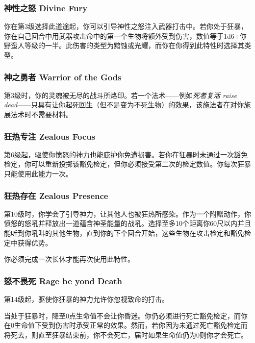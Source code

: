 \subsubsection{神性之怒 Divine Fury}你在第3级选择此道途起，你可以引导神性之怒注入武器打击中。若你处于狂暴，你在自己回合中用武器攻击命中的第一个生物将额外受到伤害，数值等于1d6+你野蛮人等级的一半。此伤害的类型为黯蚀或光耀，而你在你得到此特性时选择其类型。
\subsubsection{神之勇者 Warrior of the Gods}第3级时，你的灵魂被无尽的战斗所烙印。若一个法术——例如\emph{死者复活 raise dead}——只具有让你起死回生（但不是变为不死生物）的效果，该施法者在对你施展法术时不需要材料。
\subsubsection{狂热专注 Zealous Focus}第6级起，驱使你愤怒的神力也能庇护你免遭损害。若你在狂暴时未通过一次豁免检定，你可以重新投掷该豁免检定，但你必须接受第二次的检定数值。你每次狂暴只能使用此能力一次。
\subsubsection{狂热存在 Zealous Presence}第10级时，你学会了引导神力，让其他人也被狂热所感染。作为一个附赠动作，你愤怒的怒吼并释放出一道蕴含神圣能量的战吼。选择至多10个距离你60尺以内并且能听到你吼叫的其他生物，直到你的下个回合开始，这些生物在攻击检定和豁免检定中获得优势。

你必须完成一次长休才能再次使用此特性。
\subsubsection{怒不畏死 Rage be yond Death}第14级起，驱使你狂暴的神力允许你忽视致命的打击。

当处于狂暴时，降至0点生命值不会让你昏迷。你仍必须进行死亡豁免检定，而你在0生命值下受到伤害时承受正常的效果。然而，若你因为未通过死亡豁免检定而将死去，则直至狂暴结束前，你不会死亡，届时如果生命值仍为0则你才会死亡。

